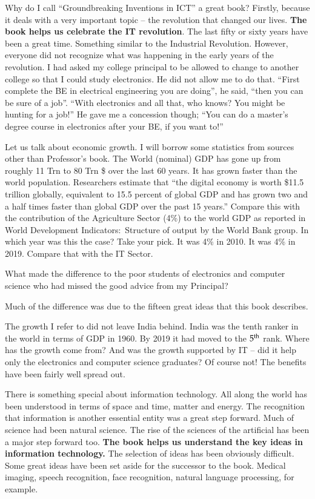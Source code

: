 \begin{multicols}{2}

Why do I call “Groundbreaking Inventions in ICT” a great book? Firstly, because it deals with a very important topic – the revolution that changed our lives. \textbf{The book helps us celebrate the IT revolution}. The last fifty or sixty years have been a great time. Something similar to the Industrial Revolution. However, everyone did not recognize what was happening in the early years of the revolution. I had asked my college principal to be allowed to change to another college so that I could study electronics. He did not allow me to do that. “First complete the BE in electrical engineering you are doing”, he said, “then you can be sure of a job”. “With electronics and all that, who knows? You might be hunting for a job!” He gave me a concession though; “You can do a master’s degree course in electronics after your BE, if you want to!”

Let us talk about economic growth. I will borrow some statistics from sources other than Professor’s book. The World (nominal) GDP has gone up from roughly 11 Trn to 80 Trn \$ over the last 60 years. It has grown faster than the world population. Researchers estimate that “the digital economy is worth \$11.5 trillion globally, equivalent to 15.5 percent of global GDP and has grown two and a half times faster than global GDP over the past 15 years.” Compare this with the contribution of the Agriculture Sector (4\%) to the world GDP as reported in World Development Indicators: Structure of output \cite{art3-key01} by the World Bank group. In which year was this the case? Take your pick. It was 4\% in 2010. It was 4\% in 2019. Compare that with the IT Sector.

What made the difference to the poor students of electronics and computer science who had missed the good advice from my Principal?

Much of the difference was due to the fifteen great ideas that this book describes. 

The growth I refer to did not leave India behind. India was the tenth ranker in the world in terms of GDP in 1960. By 2019 it had moved to the $5^{\rm th}$ rank. Where has the growth come from?  And was the growth supported by IT – did it help only the electronics and computer science graduates? Of course not! The benefits have been fairly well spread out.

There is something special about information technology. All along the world has been understood in terms of space and time, matter and energy. The recognition that information is another essential entity was a great step forward. Much of science had been natural science. The rise of the sciences of the artificial has been a major step forward too. \textbf{The book helps us understand the key ideas in information technology.} The selection of ideas has been obviously difficult. Some great ideas have been set aside for the successor to the book. Medical imaging, speech recognition, face recognition, natural language processing, for example. 


\end{multicols}
